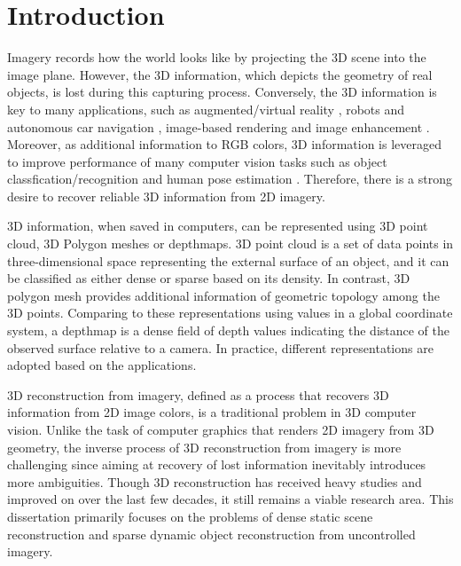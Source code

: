 \chapter{Introduction}

Imagery records how the world looks like by projecting the 3D scene into the image plane. However, the 3D information, which depicts the geometry of real objects, is lost during this capturing process. Conversely, the 3D information is key to many applications, such as augmented/virtual reality \cite{ventura2008depth}, robots and autonomous car navigation \cite{endres2012evaluation}, image-based rendering \cite{View_interpolation1993} and image enhancement \cite{zhang2014personal}. Moreover, as additional information to RGB colors, 3D information is leveraged to improve performance of many computer vision tasks such as object classfication/recognition \cite{gupta2013perceptual}  and human pose estimation \cite{CVPR_kinect}. Therefore, there is a strong desire to recover reliable 3D information from 2D imagery.

3D information, when saved in computers, can be represented using 3D point cloud, 3D Polygon meshes or depthmaps. 3D point cloud is a set of data points in three-dimensional space representing the external surface of an object, and it can be classified as either dense or sparse based on its density. In contrast, 3D polygon mesh provides additional information of geometric topology among the 3D points. Comparing to these representations using values in a global coordinate system, a depthmap is a dense field of depth values indicating the distance of the observed surface relative to a camera. In practice, different representations are adopted based on the applications. 

3D reconstruction from imagery, defined as a process that recovers 3D information from 2D image colors, is a traditional problem in 3D computer vision. Unlike the task of computer graphics that renders 2D imagery from 3D geometry, the inverse process of 3D reconstruction from imagery is more challenging since aiming at recovery of lost information inevitably introduces more ambiguities. Though 3D reconstruction has received heavy studies and improved on over the last few decades, it still remains a viable research area. This dissertation primarily focuses on the problems of dense static scene reconstruction and sparse dynamic object reconstruction from uncontrolled imagery.

